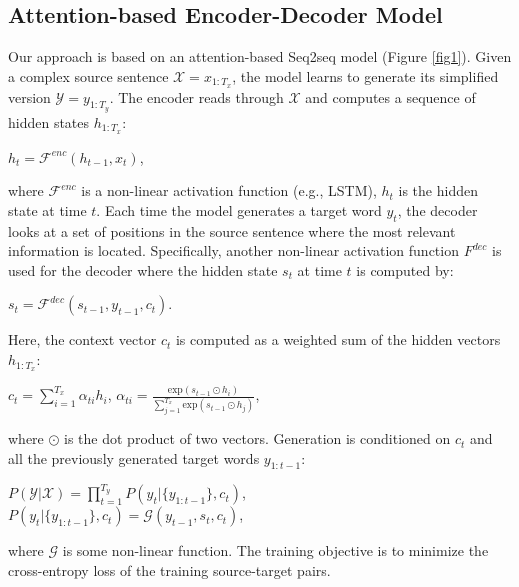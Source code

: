 \documentclass[11pt,a4paper]{article}
\begin{document}
\subsection{Attention-based Encoder-Decoder Model}
\label{sec3.1}
Our approach is based on an attention-based Seq2seq model \cite{Bahdanau:15} (Figure \ref{fig1}). Given a complex source sentence $\mathcal{X} = x_{1:T_x}$, the model learns to generate its simplified version $\mathcal{Y} = y_{1:T_y}$. The encoder reads through $\mathcal{X}$ and computes a sequence of hidden states $h_{1:T_x}$:
\begin{center}
$h_t = \mathcal{F}^{enc}(h_{t-1}, x_t)$,
\end{center}
where $\mathcal{F}^{enc}$ is a non-linear activation function (e.g., LSTM), $h_t$ is the hidden state at time $t$. Each time the model generates a target word $y_t$, the decoder looks at a set of positions in the source sentence where the most relevant information is located. Specifically, another non-linear activation function $F^{dec}$ is used for the decoder where the hidden state $s_t$ at time $t$ is computed by:
\begin{center}
$s_t = \mathcal{F}^{dec}(s_{t-1}, y_{t-1}, c_t)$.
\end{center}
Here, the context vector $c_t$ is computed as a weighted sum of the hidden vectors $h_{1:T_x}$:
\begin{center}
$c_t = \sum\limits_{i=1}^{T_x} \alpha_{ti}h_i$, \hspace*{8mm}
$\alpha_{ti} = \frac{\text{exp} (s_{t-1} \odot h_i)}{ \sum\limits_{j=1}^{T_x} \text{exp} (s_{t-1} \odot h_j)}$,
\end{center}
where $\odot$ is the dot product of two vectors. Generation is conditioned on $c_t$ and all the previously generated target words $y_{1:t-1}$:
\begin{center}
$P(\mathcal{Y}|\mathcal{X}) = \prod\limits_{t=1}^{T_y} P(y_t | \{y_{1:t-1}\}, c_t)$,\\[1mm]
$P(y_t | \{y_{1:t-1}\}, c_t) =  \mathcal{G}(y_{t-1}, s_t, c_t)$, 
\end{center} 
where $\mathcal{G}$ is some non-linear function. The training objective is to minimize the cross-entropy loss of the training source-target pairs.
\end{document}
